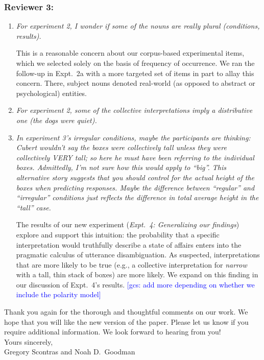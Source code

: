 \documentclass[12pt]{article}
\newcommand{\ben}{\begin{enumerate}}
\newcommand{\een}{\end{enumerate}}
\newcommand{\gcs}[1]{\textcolor{blue}{[gcs: #1]}}
\begin{document}
\subsubsection*{Reviewer 3:}

\ben

\item \emph{For experiment 2, I wonder if some of the nouns are really plural (\emph{conditions}, \emph{results}).}

This is a reasonable concern about our corpus-based experimental items, which we selected solely on the basis of frequency of occurrence. We ran the follow-up in Expt.~2a with a more targeted set of items in part to allay this concern. There, subject nouns denoted real-world (as opposed to abstract or psychological) entities.

\item \emph{For experiment 2, some of the collective interpretations imply a distributive one (\emph{the dogs were quiet}).}

\item \emph{In experiment 3's irregular conditions, maybe the participants are thinking: Cubert wouldn't say the boxes were collectively tall unless they were collectively VERY tall; so here he must have been referring to the individual boxes. Admittedly, I'm not sure how this would apply to ``big''. This alternative story suggests that you should control for the actual height of the boxes when predicting responses. Maybe the difference between ``regular'' and ``irregular'' conditions just reflects the difference in total average height in the ``tall'' case.}

The results of our new experiment (\emph{Expt.~4: Generalizing our findings}) explore and support this intuition: the probability that a specific interpretation would truthfully describe a state of affairs enters into the pragmatic calculus of utterance disambiguation. As suspected, interpretations that are more likely to be true (e.g., a collective interpretation for \emph{narrow} with a tall, thin stack of boxes) are more likely. We expand on this finding in our discussion of Expt.~4's results. \gcs{add more depending on whether we include the polarity model}

\een


\newpage

\noindent Thank you again for the thorough and thoughtful comments on our work. We hope that you will like the new version of the paper. Please let us know if you require additional information. We look forward to hearing from you!\\[25pt]


\noindent Yours sincerely,\\[10pt]

\noindent Gregory Scontras and Noah D.~Goodman
\end{document}
